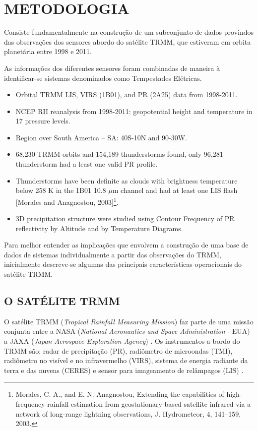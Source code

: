 \chapter{METODOLOGIA}

Consiste fundamentalmente na construção de um subconjunto de dados provindos das observações dos sensores abordo do satélite TRMM, que estiveram em orbita planetária entre 1998 e 2011. 

As informações dos diferentes sensores foram combinadas de maneira à identificar-se sistemas denominados como Tempestades Elétricas.


\begin{itemize}
\item Orbital TRMM LIS, VIRS (1B01), and PR (2A25) data from 1998-2011. 
\item NCEP RII reanalysis from 1998-2011: geopotential height and temperature in 17 pressure levels.
\item Region over South America -- SA: 40S-10N and 90-30W.
\item 68,230 TRMM orbits and 154,189 thunderstorms found, only 96,281 thunderstorm had a least one valid PR profile.
\item Thunderstorms have been definite as clouds with brightness temperature below 258 K in the 1B01 10.8 $\mu$m channel and had at least one LIS flash [Morales and Anagnostou, 2003]\footnote{Morales, C. A., and E. N. Anagnostou, Extending the capabilities of high-frequency rainfall estimation from geostationary-based satellite infrared via a network of long-range lightning observations, J. Hydrometeor, 4, 141–159, 2003.}.
\item 3D precipitation structure were studied using Contour Frequency of PR reflectivity by Altitude and by Temperature Diagrams.
\end{itemize}



Para melhor entender as implicações que envolvem a construção de uma base de dados de sistemas individualmente a partir das observações do TRMM, inicialmente descreve-se algumas das principais características operacionais do satélite TRMM.

\section{O SATÉLITE TRMM}

O satélite TRMM (\textit{Tropical Rainfall Measuring Mission})  faz parte de uma missão conjunta entre a NASA (\textit{National Aeronautics and Space Administration} - EUA) a JAXA (\textit{Japan Aerospace Exploration Agency}) \cite{simpson1988}. Os instrumentos a bordo do TRMM são; radar de precipitação (PR), radiômetro de microondas (TMI),  radiômetro no visível e no infravermelho (VIRS), sistema de energia radiante da terra e das nuvens (CERES) e sensor para imageamento de relâmpagos (LIS) \cite{kummerok1998}. 


